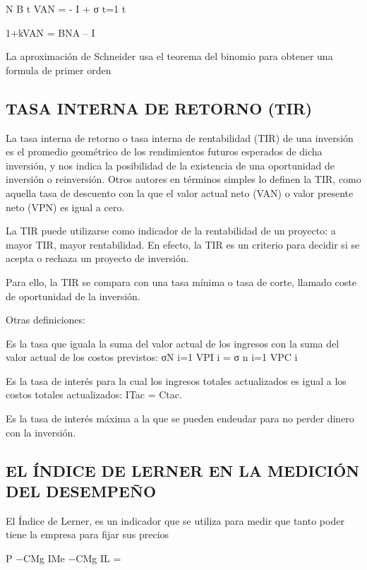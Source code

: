 \documentclass[
  letterpaper,
  DIV=11,
  numbers=noendperiod]{scrartcl}
\begin{document}
N B t VAN = - I + σ t=1 t

1+kVAN = BNA -- I

La aproximación de Schneider usa el teorema del binomio para obtener una
formula de primer orden

\hypertarget{tasa-interna-de-retorno-tir}{%
\subsection{TASA INTERNA DE RETORNO
(TIR)}\label{tasa-interna-de-retorno-tir}}

La tasa interna de retorno o tasa interna de rentabilidad (TIR) de una
inversión es el promedio geométrico de los rendimientos futuros
esperados de dicha inversión, y nos indica la posibilidad de la
existencia de una oportunidad de inversión o reinversión. Otros autores
en términos simples lo definen la TIR, como aquella tasa de descuento
con la que el valor actual neto (VAN) o valor presente neto (VPN) es
igual a cero.

La TIR puede utilizarse como indicador de la rentabilidad de un
proyecto: a mayor TIR, mayor rentabilidad. En efecto, la TIR es un
criterio para decidir si se acepta o rechaza un proyecto de inversión.

Para ello, la TIR se compara con una tasa mínima o tasa de corte,
llamado coste de oportunidad de la inversión.

Otras definiciones:

Es la tasa que iguala la suma del valor actual de los ingresos con la
suma del valor actual de los costos previstos: σN i=1 VPI i = σ n i=1
VPC i

Es la tasa de interés para la cual los ingresos totales actualizados es
igual a los costos totales actualizados: ITac = Ctac.

Es la tasa de interés máxima a la que se pueden endeudar para no perder
dinero con la inversión.

\hypertarget{el-uxedndice-de-lerner-en-la-mediciuxf3n-del-desempeuxf1o}{%
\subsection{EL ÍNDICE DE LERNER EN LA MEDICIÓN DEL
DESEMPEÑO}\label{el-uxedndice-de-lerner-en-la-mediciuxf3n-del-desempeuxf1o}}

El Índice de Lerner, es un indicador que se utiliza para medir que tanto
poder tiene la empresa para fijar sus precios

P −CMg IMe −CMg IL =
\end{document}
